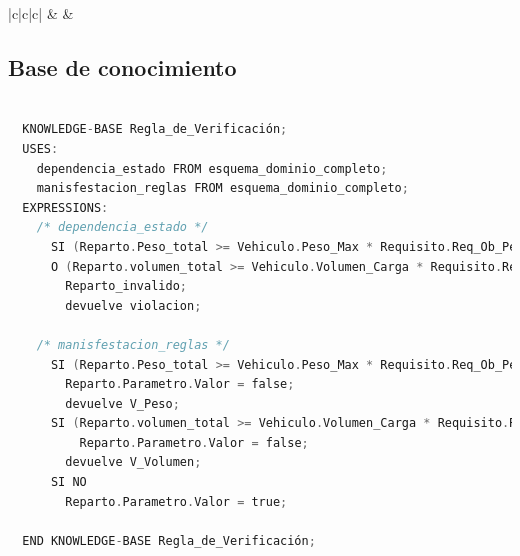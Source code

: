 \begin{table}[H]
{\begin{tabular}{|c|c|c|}
      \hline
      &  & \\
      \hline  
    \end{tabular}
  }
	\caption{\label{tab:EjemploEscenario12}Desglose del funcionamiento del sistema para el escenario 2}
\end{table}

\newpage

\subsection{Base de conocimiento}


\begin{lstlisting}[language=C,caption=\textbf{Regla\_de\_verificación}]

  KNOWLEDGE-BASE Regla_de_Verificación;
  USES:
    dependencia_estado FROM esquema_dominio_completo; 
    manisfestacion_reglas FROM esquema_dominio_completo;
  EXPRESSIONS:
    /* dependencia_estado */
      SI (Reparto.Peso_total >= Vehiculo.Peso_Max * Requisito.Req_Ob_Peso.Peso_value/100) 
      O (Reparto.volumen_total >= Vehiculo.Volumen_Carga * Requisito.Req_Ob_Volumen.Volumen_value/100) CAUSA 
        Reparto_invalido;
        devuelve violacion;
    
    /* manisfestacion_reglas */
      SI (Reparto.Peso_total >= Vehiculo.Peso_Max * Requisito.Req_Ob_Peso.Peso_value/100) TIENE-MANIFESTACION
        Reparto.Parametro.Valor = false;
        devuelve V_Peso;
      SI (Reparto.volumen_total >= Vehiculo.Volumen_Carga * Requisito.Req_Ob_Volumen.Volumen_value/100) TIENE-MANIFESTACION
          Reparto.Parametro.Valor = false;
        devuelve V_Volumen;
      SI NO 
        Reparto.Parametro.Valor = true;
   
  END KNOWLEDGE-BASE Regla_de_Verificación;
\end{lstlisting}

\newpage    

